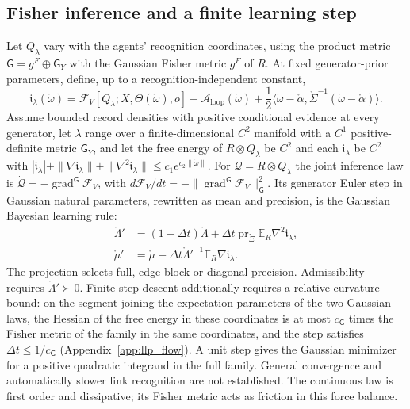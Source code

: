 \subsection{Fisher inference and a finite learning step}
\label{sec:latent_link_recognition}
Let $Q_\lambda$ vary with the agents' recognition coordinates, using the product metric
$\mathsf G=g^F\oplus\mathsf G_Y$ with the Gaussian Fisher metric $g^F$ of $R$. At fixed
generator-prior parameters, define, up to a recognition-independent constant,
\begin{equation}
\mathfrak i_\lambda(\mathring\omega)
=\mathcal F_V[Q_\lambda;X,\Theta(\mathring\omega),o]
+\mathcal A_{\mathrm{loop}}(\mathring\omega)
+\frac12\langle\mathring\omega-\mathring\alpha,
\mathring\Sigma^{-1}(\mathring\omega-\mathring\alpha)\rangle.
\label{eq:latent_link_integrand}
\end{equation}
Assume bounded record densities with positive conditional evidence at every generator,
let $\lambda$ range over a finite-dimensional $C^2$ manifold with a $C^1$ positive-definite
metric $\mathsf G_Y$, and let the free energy of $R\otimes Q_\lambda$ be $C^2$ and each
$\mathfrak i_\lambda$ be $C^2$ with
$|\mathfrak i_\lambda|+\|\nabla\mathfrak i_\lambda\|+\|\nabla^2\mathfrak i_\lambda\|\leq c_1e^{c_2\|\mathring\omega\|}$.
For $\mathcal Q=R\otimes Q_\lambda$ the joint inference law is
$\dot{\mathcal Q}=-\operatorname{grad}^{\mathsf G}\mathcal F_V$,
with $d\mathcal F_V/dt=-\|\operatorname{grad}^{\mathsf G}\mathcal F_V\|_{\mathsf G}^2$.
Its generator Euler step in Gaussian natural parameters, rewritten as mean and
precision, is the Gaussian Bayesian learning rule:
\begin{equation}
\boxed{\begin{aligned}
\mathring\Lambda'&=(1-\Delta t)\mathring\Lambda
+\Delta t\operatorname{pr}_{\mathring\Xi}\mathbb E_R\nabla^2\mathfrak i_\lambda,\\
\mathring\mu'&=\mathring\mu-\Delta t\mathring\Lambda'^{-1}
\mathbb E_R\nabla\mathfrak i_\lambda.
\end{aligned}}
\label{eq:latent_link_blr}
\end{equation}
The projection selects full, edge-block or diagonal precision. Admissibility requires
$\mathring\Lambda'\succ0$. Finite-step descent additionally requires a relative curvature
bound: on the segment joining the expectation parameters of the two Gaussian laws, the
Hessian of the free energy in these coordinates is at most $c_{\mathsf G}$ times the Fisher
metric of the family in the same coordinates, and the step satisfies
$\Delta t\leq1/c_{\mathsf G}$ (Appendix~\ref{app:llp_flow}).
A unit step gives the Gaussian minimizer for a positive quadratic integrand in the full
family. General convergence and automatically slower link recognition are not established.
The continuous law is first order and dissipative; its Fisher metric acts as friction
in this force balance.


